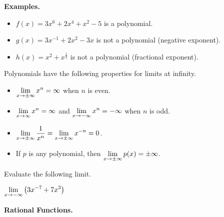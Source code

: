 \documentclass[12pt]{article}
\begin{document}
\vspace{5mm}

\textbf{Examples.}
\begin{itemize}
	\item $f(x)=3x^6+2x^4+x^2-5$ is a polynomial.
	\item $g(x)=3x^{-1}+2x^2-3x$ is not a polynomial (negative exponent).
	\item $h(x)=x^2+x^\frac{1}{2}$ is not a polynomial (fractional exponent).
\end{itemize}

\vspace{3mm}

Polynomials have the following properties for limits at infinity.
\begin{itemize}
	\item $\displaystyle\lim_{x\to\pm\infty}x^n=\infty$ when $n$ is even.
	\item $\displaystyle\lim_{x\to\infty}x^n=\infty$ and $\displaystyle\lim_{x\to -\infty}x^{n}=-\infty$ when $n$ is odd.
	\item $\displaystyle\lim_{x\to\pm\infty}\frac{1}{x^n}=\lim_{x\to\pm\infty}x^{-n}=0$.
	\item If $p$ is any polynomial, then $\displaystyle\lim_{x\to\pm\infty}p(x)=\pm\infty$.
\end{itemize}

\newpage

\Example Evaluate the following limit.

\vspace{5mm}

\hspace{10mm} $\displaystyle\lim_{x\to -\infty}\left( 3x^{-7}+7x^3\right)$

\vspace{50mm}

\textbf{Rational Functions.}

\vspace{3mm}


\vspace{3mm}


\vspace{5mm}
\end{document}
